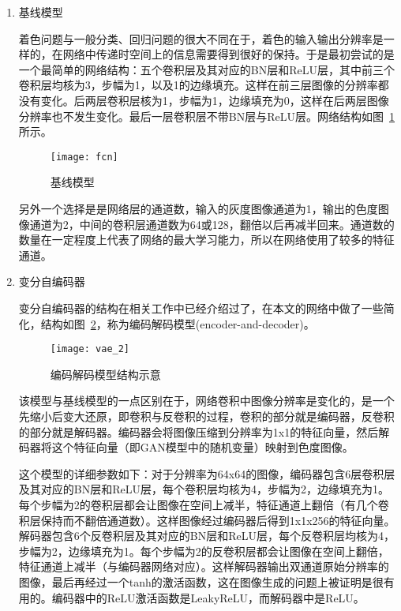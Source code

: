   \begin{enumerate}
  \item 基线模型
  
  着色问题与一般分类、回归问题的很大不同在于，着色的输入输出分辨率是一样的，在网络中传递时空间上的信息需要得到很好的保持。于是最初尝试的是一个最简单的网络结构：五个卷积层及其对应的BN层和ReLU层，其中前三个卷积层均核为3，步幅为1，以及1的边缘填充。这样在前三层图像的分辨率都没有变化。后两层卷积层核为1，步幅为1，边缘填充为0，这样在后两层图像分辨率也不发生变化。最后一层卷积层不带BN层与ReLU层。网络结构如图~\ref{fig:fcn}所示。

  \begin{figure}[H]
    \centering
    \texttt{[image: fcn]}
    \caption{基线模型}
    \label{fig:fcn}
  \end{figure}

  另外一个选择是是网络层的通道数，输入的灰度图像通道为1，输出的色度图像通道为2，中间的卷积层通道数为64或128，翻倍以后再减半回来。通道数的数量在一定程度上代表了网络的最大学习能力，所以在网络使用了较多的特征通道。

  \item 变分自编码器

  变分自编码器的结构在相关工作中已经介绍过了，在本文的网络中做了一些简化，结构如图~\ref{fig:vae-2}，称为编码解码模型(encoder-and-decoder)。

  \begin{figure}[H]
    \centering
    \texttt{[image: vae\_2]}
    \caption{编码解码模型结构示意}
    \label{fig:vae-2}
  \end{figure}

  该模型与基线模型的一点区别在于，网络卷积中图像分辨率是变化的，是一个先缩小后变大还原，即卷积与反卷积的过程，卷积的部分就是编码器，反卷积的部分就是解码器。编码器会将图像压缩到分辨率为1x1的特征向量，然后解码器将这个特征向量（即GAN模型中的随机变量）映射到色度图像。

  这个模型的详细参数如下：对于分辨率为64x64的图像，编码器包含6层卷积层及其对应的BN层和ReLU层，每个卷积层均核为4，步幅为2，边缘填充为1。每个步幅为2的卷积层都会让图像在空间上减半，特征通道上翻倍（有几个卷积层保持而不翻倍通道数）。这样图像经过编码器后得到1x1x256的特征向量。解码器包含6个反卷积层及其对应的BN层和ReLU层，每个反卷积层均核为4，步幅为2，边缘填充为1。每个步幅为2的反卷积层都会让图像在空间上翻倍，特征通道上减半（与编码器网络对应）。这样解码器输出双通道原始分辨率的图像，最后再经过一个tanh的激活函数，这在图像生成的问题上被证明是很有用的。编码器中的ReLU激活函数是LeakyReLU，而解码器中是ReLU。


\end{enumerate}

